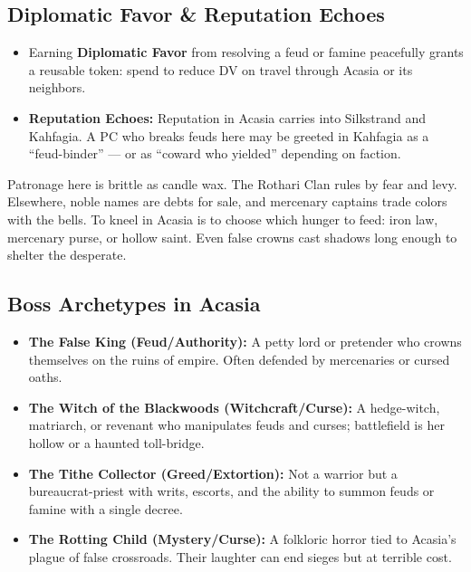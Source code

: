 \subsection*{Diplomatic Favor \& Reputation Echoes}
\begin{itemize}
  \item Earning \textbf{Diplomatic Favor} from resolving a feud or famine peacefully grants a reusable token: spend to reduce DV on travel through Acasia or its neighbors.
  \item \textbf{Reputation Echoes:} Reputation in Acasia carries into Silkstrand and Kahfagia. A PC who breaks feuds here may be greeted in Kahfagia as a “feud-binder” — or as “coward who yielded” depending on faction.
\end{itemize}

\begin{tcolorbox}[colback=black!3,colframe=black!40!white,title={Decline \& Patronage}]
Patronage here is brittle as candle wax. The Rothari Clan rules by fear and levy. Elsewhere, noble names are debts for sale, and mercenary captains trade colors with the bells. To kneel in Acasia is to choose which hunger to feed: iron law, mercenary purse, or hollow saint. Even false crowns cast shadows long enough to shelter the desperate.
\end{tcolorbox}

\subsection*{Boss Archetypes in Acasia}
\label{sec:acasia-bosses}

\begin{itemize}
  \item \textbf{The False King (Feud/Authority):} A petty lord or pretender who crowns themselves on the ruins of empire. Often defended by mercenaries or cursed oaths. 
  \item \textbf{The Witch of the Blackwoods (Witchcraft/Curse):} A hedge-witch, matriarch, or revenant who manipulates feuds and curses; battlefield is her hollow or a haunted toll-bridge. 
  \item \textbf{The Tithe Collector (Greed/Extortion):} Not a warrior but a bureaucrat-priest with writs, escorts, and the ability to summon feuds or famine with a single decree.
  \item \textbf{The Rotting Child (Mystery/Curse):} A folkloric horror tied to Acasia’s plague of false crossroads. Their laughter can end sieges but at terrible cost. 
\end{itemize}

